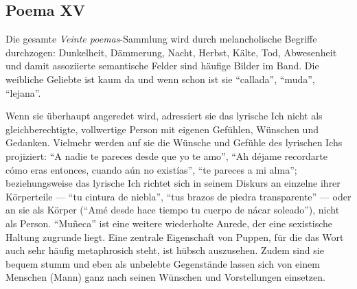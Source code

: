 \subsection{Poema XV}
Die gesamte \textit{Veinte poemas}-Sammlung wird durch melancholische Begriffe durchzogen:
Dunkelheit, Dämmerung, Nacht, Herbst, Kälte, Tod, Abwesenheit und damit assoziierte semantische Felder sind häufige Bilder im Band.
Die weibliche Geliebte ist kaum da und wenn schon ist sie ``callada'', ``muda'', ``lejana''.

Wenn sie überhaupt angeredet wird, adressiert sie das lyrische Ich nicht als gleichberechtigte, vollwertige Person mit eigenen Gefühlen, Wünschen und Gedanken.
Vielmehr werden auf sie die Wünsche und Gefühle des lyrischen Ichs projiziert:
``A nadie te pareces desde que yo te amo'', ``Ah déjame recordarte cómo eras entonces, cuando aún no existías'', ``te pareces a mi alma'';
beziehungsweise das lyrische Ich richtet sich in seinem Diskurs an einzelne ihrer Körperteile — ``tu cintura de niebla'', ``tus brazos de piedra transparente'' — oder an sie als Körper (``Amé desde hace tiempo tu cuerpo de nácar soleado''), nicht als Person. %
``Muñeca'' ist eine weitere wiederholte Anrede, der eine sexistische Haltung zugrunde liegt.
Eine zentrale Eigenschaft von Puppen, für die das Wort auch sehr häufig metaphrosich steht, ist hübsch auszusehen. %
Zudem sind sie bequem stumm und eben als unbelebte Gegenstände lassen sich von einem Menschen (Mann) ganz nach seinen Wünschen und Vorstellungen einsetzen. %

